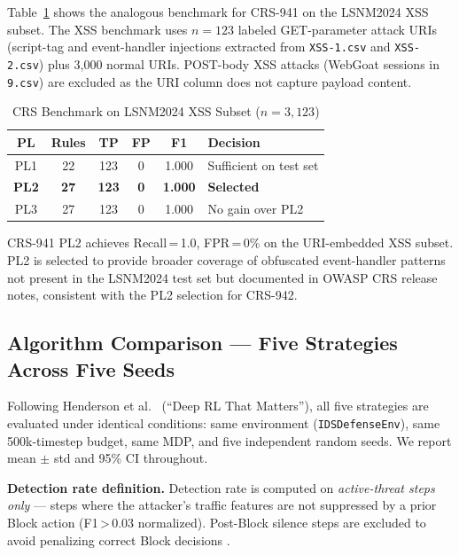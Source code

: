 \documentclass[conference]{IEEEtran}
\begin{document}
Table~\ref{tab:crs_xss} shows the analogous benchmark for CRS-941 on the
LSNM2024 XSS subset. The XSS benchmark uses $n{=}123$ labeled GET-parameter
attack URIs (script-tag and event-handler injections extracted from
\texttt{XSS-1.csv} and \texttt{XSS-2.csv}) plus 3,000 normal URIs. POST-body
XSS attacks (WebGoat sessions in \texttt{9.csv}) are excluded as the URI
column does not capture payload content.

\begin{table}[htbp]
\caption{CRS Benchmark on LSNM2024 XSS Subset ($n{=}3{,}123$)}
\label{tab:crs_xss}
\centering
\small
\begin{tabular}{cccccl}
\toprule
\textbf{PL} & \textbf{Rules} & \textbf{TP} & \textbf{FP}
  & \textbf{F1} & \textbf{Decision} \\
\midrule
PL1 & 22 & 123 & 0 & 1.000 & Sufficient on test set \\
\textbf{PL2} & \textbf{27} & \textbf{123} & \textbf{0}
  & \textbf{1.000} & \textbf{Selected} \\
PL3 & 27 & 123 & 0 & 1.000 & No gain over PL2 \\
\bottomrule
\end{tabular}
\end{table}

CRS-941 PL2 achieves Recall\,=\,1.0, FPR\,=\,0\% on the URI-embedded XSS
subset. PL2 is selected to provide broader coverage of obfuscated
event-handler patterns not present in the LSNM2024 test set but documented
in OWASP CRS release notes, consistent with the PL2 selection for CRS-942.

\subsection{Algorithm Comparison --- Five Strategies Across Five Seeds}

Following Henderson et al.\ \cite{henderson2018deeprl} (``Deep RL That
Matters''), all five strategies are evaluated under identical conditions:
same environment (\texttt{IDSDefenseEnv}), same 500k-timestep budget, same
MDP, and five independent random seeds. We report mean $\pm$ std and 95\%
CI throughout.

\textbf{Detection rate definition.}
Detection rate is computed on \emph{active-threat steps only} --- steps
where the attacker's traffic features are not suppressed by a prior Block
action (F1\,>\,0.03 normalized). Post-Block silence steps are excluded to
avoid penalizing correct Block decisions \cite{henderson2018deeprl}.
\end{document}
